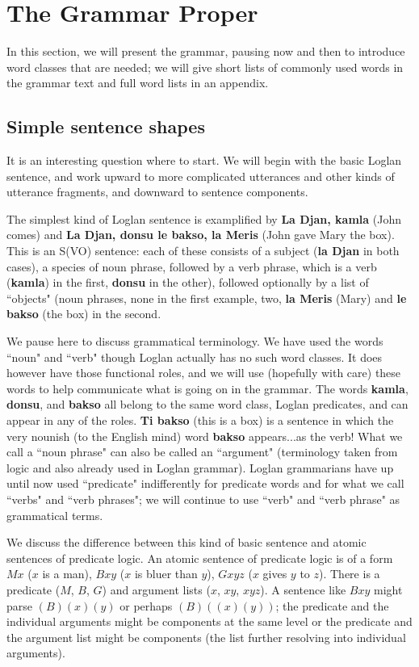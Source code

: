 \documentclass[12pt]{book}
\begin{document}
{\chapter{The Grammar Proper}

In this section, we will present the grammar, pausing now and then to introduce word classes that are needed;  we will give short lists of commonly used words in the grammar text and full word lists in an appendix.

\section{Simple sentence shapes}

It is an interesting question where to start.  We will begin with the basic Loglan sentence, and work upward to more complicated utterances and other kinds of utterance fragments, and downward to sentence components.

The simplest kind of Loglan sentence is examplified by {\bf La Djan, kamla} (John comes) and {\bf La Djan, donsu le bakso, la Meris} (John gave Mary the box).  This is an S(VO) sentence:  each of these consists of a subject ({\bf la Djan} in both cases), a species of noun phrase, followed by a verb phrase, which is a verb ({\bf kamla}) in the first, {\bf donsu} in the other), followed optionally by a list of ``objects" (noun phrases, none in the first example, two, {\bf la Meris} (Mary) and {\bf le bakso} (the box) in the second.

We pause here to discuss grammatical terminology.  We have used the words ``noun" and ``verb"  though Loglan actually has no such word classes.  It does however have those functional roles, and we will use (hopefully with care) these words to help communicate what is going on in the grammar.  The words {\bf kamla}, {\bf donsu}, and {\bf bakso} all belong to the same word class, Loglan predicates, and can appear in any of the roles.  {\bf Ti bakso} (this is a box) is a sentence in which the very nounish (to the English mind) word {\bf bakso} appears...as the verb!  What we call a ``noun phrase" can also be called an ``argument" (terminology taken from logic and also already used in Loglan grammar).  Loglan grammarians have up until now used ``predicate" indifferently for predicate words and for what we call ``verbs" and ``verb phrases";  we will continue to use ``verb" and ``verb phrase" as grammatical terms.

We discuss the difference between this kind of basic sentence and atomic sentences of predicate logic.  An atomic sentence of predicate logic is of a form $Mx$ ($x$ is a man),
$Bxy$ ($x$ is bluer than $y$), $Gxyz$ ($x$ gives $y$ to $z$).  There is a predicate ($M$, $B$, $G$) and argument lists ($x$, $xy$, $xyz$).  A sentence like $Bxy$ might parse
$(B)(x)(y)$ or perhaps $(B)((x)(y))$;  the predicate and the individual arguments might be components at the same level or the predicate and the argument list might be components (the list further resolving into individual arguments).

}
\end{document}
